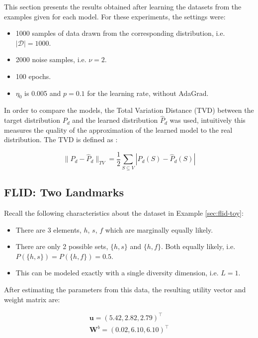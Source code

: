 This section presents the results obtained after learning the datasets from the examples given for each model. For these experiments, the settings were:

\begin{itemize}
  \item 1000 samples of data drawn from the corresponding distribution, i.e. $|\mathcal{D}| = 1000$.
  \item 2000 noise samples, i.e. $\nu = 2$.
  \item 100 epochs.
  \item $\eta_{0}$ is 0.005 and $p = 0.1$ for the learning rate, without AdaGrad.
\end{itemize}

In order to compare the models, the Total Variation Distance (TVD) between the target distribution $P_{d}$ and the learned distribution $\hat{P}_{d}$ was used, intuitively this measures the quality of the approximation of the learned model to the real distribution. The TVD is defined as \citep[chap. 4]{levin2009markov}:

\begin{equation}
  \label{eq:total_var}
  \|P_{d} - \hat{P}_{d}\|_{TV}= \frac{1}{2}\sum_{S \subseteq V}|P_{d}(S) - \hat{P}_{d}(S)|
\end{equation}

\subsection{FLID: Two Landmarks}

Recall the following characteristics about the dataset in Example \ref{sec:flid-toy}:

\begin{itemize}
  \item There are 3 elements, $h$, $s$, $f$ which are marginally equally likely.
  \item There are only 2 possible sets, $\{h,s\}$ and $\{h,f\}$. Both equally likely, i.e. $P(\{h,s\}) = P(\{h,f\}) = 0.5$.
  \item This can be modeled exactly with a single diversity dimension, i.e. $L=1$.
\end{itemize}

After estimating the parameters from this data, the resulting utility vector and weight matrix are:

\begin{align*}
  \mathbf{u} = \left(5.42,2.82,2.79\right)^{\intercal} \\
  \mathbf{W}^{b} = \left(0.02, 6.10, 6.10\right)^{\intercal}
\end{align*}

